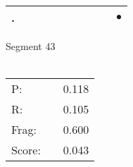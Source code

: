 \documentclass[landscape]{article}
\newcommand{\ssp}{\hspace{2pt}}
\newcommand{\mex}{\cellcolor{g}$\bullet$}
\begin{document}
\begin{tabular}{|l|p{10pt}|p{10pt}|p{10pt}|p{10pt}|p{10pt}|p{10pt}|p{10pt}|p{10pt}|p{10pt}|}
\hline
\ssp \cellcolor{ref8}. \ssp&\hspace{2pt}&\hspace{2pt}&\hspace{2pt}&\hspace{2pt}&\hspace{2pt}&\hspace{2pt}&\hspace{2pt}&\hspace{2pt}&\hspace{2pt}\mex\\
\hline
\end{tabular}

\vspace{6pt}
\noindent Segment 43\\\\
\noindent\begin{tabular}{lm{12pt}r}
\hline
P:&&0.118\\
R:&&0.105\\
Frag:&&0.600\\
Score:&&0.043\\
\end{tabular}

\newpage
\end{document}
